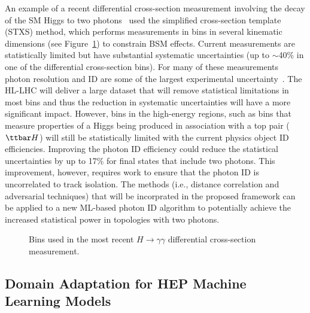 \documentclass[letter, USenglish, 11pt, subfigure]{article}
\begin{document}
An example of a recent differential cross-section measurement involving the decay of the SM Higgs to two photons~\cite{ATLAS_STXS} used the simplified cross-section template (STXS) method, which performs measurements in bins in several kinematic dimensions (see Figure~\ref{fig:ggH_STXS}) to constrain BSM effects. Current measurements are statistically limited but have substantial systematic uncertainties (up to $\sim$40\% in one of the differential cross-section bins). For many of these measurements photon resolution and ID are some of the largest experimental uncertainty~\cite{ATLAS_STXS}. The HL-LHC will deliver a large dataset that will remove statistical limitations in most bins and thus the reduction in systematic uncertainties will have a more significant impact. However, bins in the high-energy regions, such as bins that measure properties of a Higgs being produced in association with a top pair ($\ttbar H$) will still be statistically limited with the current physics object ID efficiencies. Improving the photon ID efficiency could reduce the statistical uncertainties by up to 17\% for final states that include two photons. This improvement, however, requires work to ensure that the photon ID is uncorrelated to track isolation. The methods (i.e., distance correlation and adversarial techniques) that will be incorprated in 
the proposed framework can be applied to a new ML-based photon ID algorithm to potentially achieve the increased statistical power in topologies with two photons.

\begin{figure}[!htbp]  
  \centering
  \caption{\label{fig:ggH_STXS} Bins used in the most recent $H\to\gamma\gamma$ differential cross-section measurement.}
\end{figure}


\subsection{Domain Adaptation for HEP Machine Learning Models}
\end{document}
